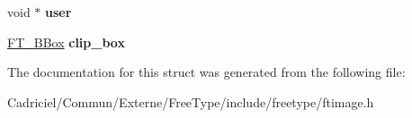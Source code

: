 \begin{DoxyCompactItemize}
\item 
void $\ast$ {\bfseries user}\hypertarget{struct_f_t___raster___params___af78bac59f93c989840bbcbcbefd77c55}{}\label{struct_f_t___raster___params___af78bac59f93c989840bbcbcbefd77c55}

\item 
\hyperlink{struct_f_t___b_box__}{F\+T\+\_\+\+B\+Box} {\bfseries clip\+\_\+box}\hypertarget{struct_f_t___raster___params___ab32f75f19d9cacb20e410886c055e306}{}\label{struct_f_t___raster___params___ab32f75f19d9cacb20e410886c055e306}

\end{DoxyCompactItemize}


The documentation for this struct was generated from the following file\+:\begin{DoxyCompactItemize}
\item 
Cadriciel/\+Commun/\+Externe/\+Free\+Type/include/freetype/ftimage.\+h\end{DoxyCompactItemize}
